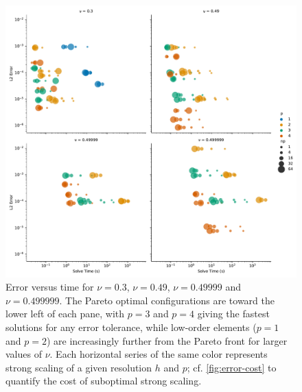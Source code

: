 \begin{figure}[pbt!]
 \begin{center}
      \includegraphics[width=1\textwidth]{../img/error-time.pdf}
\end{center}
\caption{
Error versus time for $\nu = 0.3$, $\nu = 0.49$, $\nu = 0.49999$ and $\nu = 0.499999$.
The Pareto optimal configurations are toward the lower left of each pane, with $p = 3$ and $p = 4$ giving the fastest solutions for any error tolerance, while low-order elements ($p = 1$ and $p = 2$) are increasingly further from the Pareto front for larger values of $\nu$.
Each horizontal series of the same color represents strong scaling of a given resolution $h$ and $p$; cf. \autoref{fig:error-cost} to quantify the cost of suboptimal strong scaling.
}
    \label{fig:error-time}
\end{figure}

